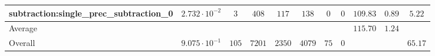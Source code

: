 \begin{tabular}{|l|c|c|c|c|c|c|c|c|c|c|}
subtraction:single\_prec\_subtraction\_0         & $ 2.732 \cdot 10^{-2} $ & $ 3      $ & $ 408  $ & $ 117  $ & $ 138   $ & $ 0  $ & $ 0 $ & $ 109.83      $ & $ 0.89    $ & $ 5.22    $ \\
\hline
Average                                          & $                     $ & $        $ & $      $ & $      $ & $       $ & $    $ & $   $ & $ 115.70      $ & $ 1.24    $ & $         $ \\
\hline
Overall                                          & $ 9.075 \cdot 10^{-1} $ & $ 105    $ & $ 7201 $ & $ 2350 $ & $ 4079  $ & $ 75 $ & $ 0 $ & $             $ & $         $ & $ 65.17   $ \\
\hline
\end{tabular}
